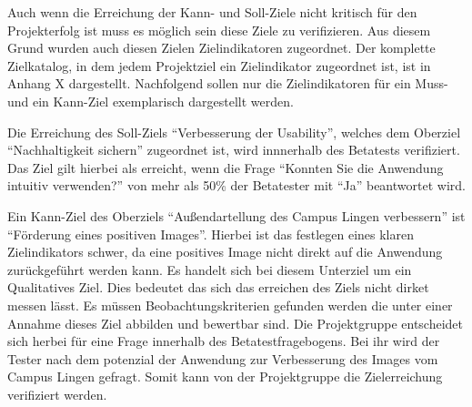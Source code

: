 Auch wenn die Erreichung der Kann- und Soll-Ziele nicht kritisch für den
Projekterfolg ist muss es möglich sein diese Ziele zu verifizieren. Aus diesem
Grund wurden auch diesen Zielen Zielindikatoren zugeordnet. Der komplette
Zielkatalog, in dem jedem Projektziel ein Zielindikator zugeordnet ist, ist in
Anhang X
dargestellt. Nachfolgend sollen nur die Zielindikatoren für ein Muss- und ein
Kann-Ziel exemplarisch dargestellt werden.


Die Erreichung des Soll-Ziels "`Verbesserung der Usability"', welches dem
Oberziel "`Nachhaltigkeit sichern"' zugeordnet ist, wird innnerhalb des
Betatests verifiziert. Das Ziel gilt hierbei als erreicht, wenn die Frage
"`Konnten Sie die Anwendung intuitiv verwenden?"' von mehr als 50\% der
Betatester mit "`Ja"' beantwortet wird.

Ein Kann-Ziel des Oberziels "`Außendartellung des Campus Lingen
verbessern"' ist "`Förderung eines positiven Images"'. Hierbei ist das festlegen
eines klaren Zielindikators schwer, da eine positives Image nicht direkt auf die
Anwendung zurückgeführt werden kann. Es handelt sich bei diesem Unterziel um ein
Qualitatives Ziel. %
Dies bedeutet das sich das erreichen des Ziels nicht dirket messen lässt. Es
müssen Beobachtungskriterien gefunden werden die unter einer Annahme dieses Ziel
abbilden und bewertbar sind. Die Projektgruppe entscheidet sich herbei für eine
Frage innerhalb des Betatestfragebogens. Bei ihr wird der Tester nach dem
potenzial der Anwendung zur Verbesserung des Images vom Campus Lingen gefragt.
Somit kann von der Projektgruppe die Zielerreichung verifiziert werden.












